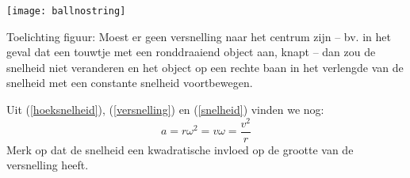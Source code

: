 \documentclass{ximera}
\begin{document}
        
        

		





    

\begin{image}
	\texttt{[image: ballnostring]}
\end{image}


Toelichting figuur: Moest er geen versnelling naar het centrum zijn -- bv. in het geval dat een touwtje met een ronddraaiend object aan, knapt -- dan zou de snelheid niet veranderen en het object op een rechte baan in het verlengde van de snelheid met een constante snelheid voortbewegen.

Uit (\ref{hoeksnelheid}), (\ref{versnelling}) en (\ref{snelheid}) vinden we nog:
\begin{equation}
	a=r\omega^2=v\omega=\frac{v^2}{r}
\end{equation}
Merk op dat de snelheid een kwadratische invloed op de grootte van de versnelling heeft.
\end{document}
